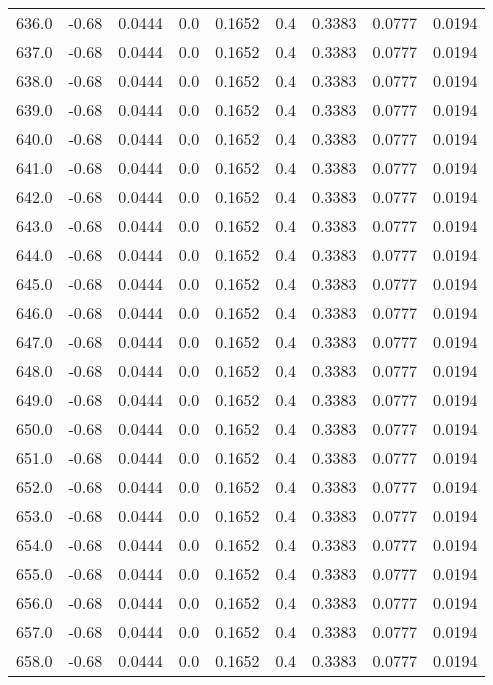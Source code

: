 \begin{longtable}{lrrrrrrrr}
636.0 & -0.68 & 0.0444 & 0.0 & 0.1652 & 0.4 & 0.3383 & 0.0777 & 0.0194 \\
637.0 & -0.68 & 0.0444 & 0.0 & 0.1652 & 0.4 & 0.3383 & 0.0777 & 0.0194 \\
638.0 & -0.68 & 0.0444 & 0.0 & 0.1652 & 0.4 & 0.3383 & 0.0777 & 0.0194 \\
639.0 & -0.68 & 0.0444 & 0.0 & 0.1652 & 0.4 & 0.3383 & 0.0777 & 0.0194 \\
640.0 & -0.68 & 0.0444 & 0.0 & 0.1652 & 0.4 & 0.3383 & 0.0777 & 0.0194 \\
641.0 & -0.68 & 0.0444 & 0.0 & 0.1652 & 0.4 & 0.3383 & 0.0777 & 0.0194 \\
642.0 & -0.68 & 0.0444 & 0.0 & 0.1652 & 0.4 & 0.3383 & 0.0777 & 0.0194 \\
643.0 & -0.68 & 0.0444 & 0.0 & 0.1652 & 0.4 & 0.3383 & 0.0777 & 0.0194 \\
644.0 & -0.68 & 0.0444 & 0.0 & 0.1652 & 0.4 & 0.3383 & 0.0777 & 0.0194 \\
645.0 & -0.68 & 0.0444 & 0.0 & 0.1652 & 0.4 & 0.3383 & 0.0777 & 0.0194 \\
646.0 & -0.68 & 0.0444 & 0.0 & 0.1652 & 0.4 & 0.3383 & 0.0777 & 0.0194 \\
647.0 & -0.68 & 0.0444 & 0.0 & 0.1652 & 0.4 & 0.3383 & 0.0777 & 0.0194 \\
648.0 & -0.68 & 0.0444 & 0.0 & 0.1652 & 0.4 & 0.3383 & 0.0777 & 0.0194 \\
649.0 & -0.68 & 0.0444 & 0.0 & 0.1652 & 0.4 & 0.3383 & 0.0777 & 0.0194 \\
650.0 & -0.68 & 0.0444 & 0.0 & 0.1652 & 0.4 & 0.3383 & 0.0777 & 0.0194 \\
651.0 & -0.68 & 0.0444 & 0.0 & 0.1652 & 0.4 & 0.3383 & 0.0777 & 0.0194 \\
652.0 & -0.68 & 0.0444 & 0.0 & 0.1652 & 0.4 & 0.3383 & 0.0777 & 0.0194 \\
653.0 & -0.68 & 0.0444 & 0.0 & 0.1652 & 0.4 & 0.3383 & 0.0777 & 0.0194 \\
654.0 & -0.68 & 0.0444 & 0.0 & 0.1652 & 0.4 & 0.3383 & 0.0777 & 0.0194 \\
655.0 & -0.68 & 0.0444 & 0.0 & 0.1652 & 0.4 & 0.3383 & 0.0777 & 0.0194 \\
656.0 & -0.68 & 0.0444 & 0.0 & 0.1652 & 0.4 & 0.3383 & 0.0777 & 0.0194 \\
657.0 & -0.68 & 0.0444 & 0.0 & 0.1652 & 0.4 & 0.3383 & 0.0777 & 0.0194 \\
658.0 & -0.68 & 0.0444 & 0.0 & 0.1652 & 0.4 & 0.3383 & 0.0777 & 0.0194 \\

\end{longtable}
